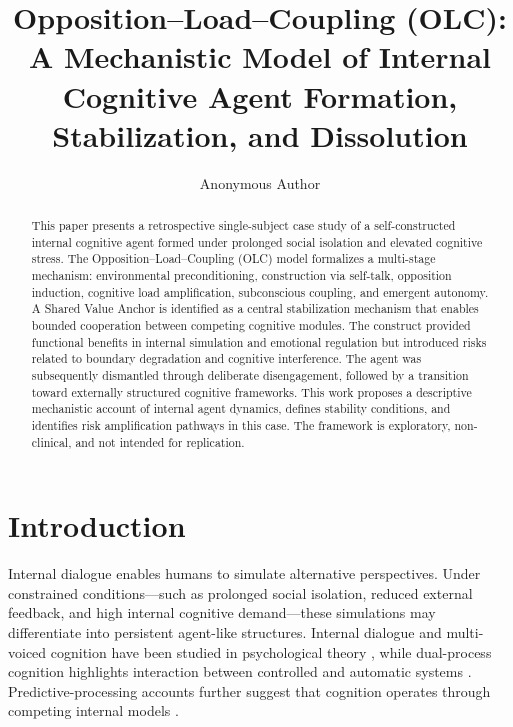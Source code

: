 \documentclass[11pt]{article}
\title{Opposition--Load--Coupling (OLC): A Mechanistic Model of Internal Cognitive Agent Formation, Stabilization, and Dissolution}
\author{Anonymous Author}
\date{}
\begin{document}
\maketitle
\onehalfspacing

\begin{center}
\end{center}

\begin{abstract}
This paper presents a retrospective single-subject case study of a self-constructed internal cognitive agent formed under prolonged social isolation and elevated cognitive stress. The Opposition--Load--Coupling (OLC) model formalizes a multi-stage mechanism: environmental preconditioning, construction via self-talk, opposition induction, cognitive load amplification, subconscious coupling, and emergent autonomy. A Shared Value Anchor is identified as a central stabilization mechanism that enables bounded cooperation between competing cognitive modules. The construct provided functional benefits in internal simulation and emotional regulation but introduced risks related to boundary degradation and cognitive interference. The agent was subsequently dismantled through deliberate disengagement, followed by a transition toward externally structured cognitive frameworks. This work proposes a descriptive mechanistic account of internal agent dynamics, defines stability conditions, and identifies risk amplification pathways in this case. The framework is exploratory, non-clinical, and not intended for replication.
\end{abstract}

\section{Introduction}
Internal dialogue enables humans to simulate alternative perspectives. Under constrained conditions---such as prolonged social isolation, reduced external feedback, and high internal cognitive demand---these simulations may differentiate into persistent agent-like structures. Internal dialogue and multi-voiced cognition have been studied in psychological theory \citep{hermans2001dialogical}, while dual-process cognition highlights interaction between controlled and automatic systems \citep{kahneman2011thinking}. Predictive-processing accounts further suggest that cognition operates through competing internal models \citep{friston2010free}.
\end{document}
